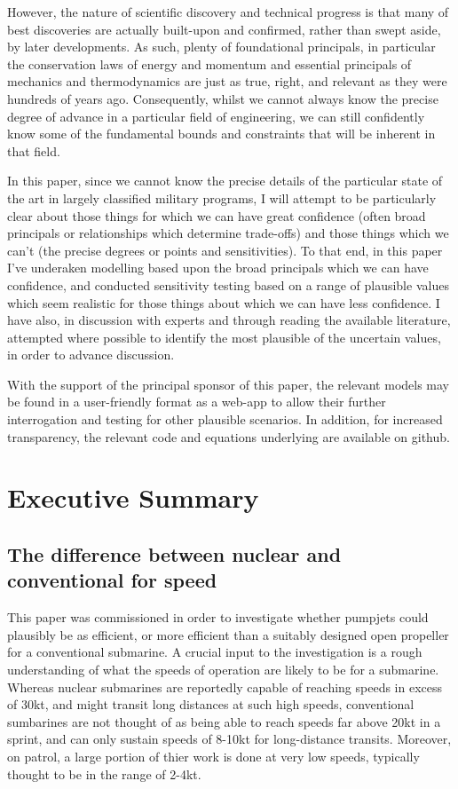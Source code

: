 \documentclass{article}\usepackage[]{graphicx}\usepackage[]{color}
\begin{document}
However, the nature of scientific discovery and technical progress is that many of best discoveries are actually built-upon and confirmed, rather than swept aside, by later developments.  As such, plenty of foundational principals, in particular the conservation laws of energy and momentum and essential principals of mechanics and thermodynamics are just as true, right, and relevant as they were hundreds of years ago.  Consequently, whilst we cannot always know the precise degree of advance in a particular field of engineering, we can still confidently know some of the fundamental bounds and constraints that will be inherent in that field.

In this paper, since we cannot know the precise details of the particular state of the art in largely classified military programs, I will attempt to be particularly clear about those things for which we can have great confidence (often broad principals or relationships which determine trade-offs) and those things which we can't (the precise degrees or points and sensitivities).  To that end, in this paper I've underaken modelling based upon the broad principals which we can have confidence, and conducted sensitivity testing based on a range of plausible values which seem realistic for those things about which we can have less confidence. I have also, in discussion with experts and through reading the available literature, attempted where possible to identify the most plausible of the uncertain values, in order to advance discussion.

With the support of the principal sponsor of this paper, the relevant models may be found in a user-friendly format as a web-app to allow their further interrogation and testing for other plausible scenarios.  In addition, for increased transparency, the relevant code and equations underlying are available on github.

\section{Executive Summary}

\subsection{The difference between nuclear and conventional for speed}
This paper was commissioned in order to investigate whether pumpjets could plausibly be as efficient, or more efficient than a suitably designed open propeller for a conventional submarine. A crucial input to the investigation is a rough understanding of what the speeds of operation are likely to be for a submarine.  Whereas nuclear submarines are reportedly capable of reaching speeds in excess of 30kt, and might transit long distances at such high speeds, conventional sumbarines are not thought of as being able to reach speeds far above 20kt in a sprint, and can only sustain speeds of 8-10kt for long-distance transits.  Moreover, on patrol, a large portion of thier work is done at very low speeds, typically thought to be in the range of 2-4kt.
\end{document}
